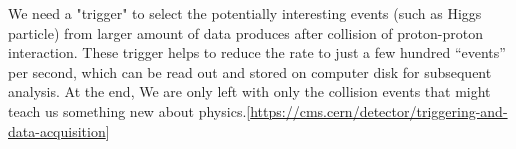 We need a "trigger" to select the potentially interesting events (such as Higgs particle) from larger amount of data produces after collision of proton-proton interaction. These trigger helps to reduce the rate to just a few hundred “events” per second, which can be read out and stored on computer disk for subsequent analysis. At the end, We are only left with only the collision events that might teach us something new about physics.[\url{https://cms.cern/detector/triggering-and-data-acquisition}]\\ 




